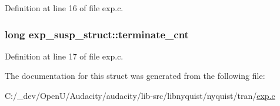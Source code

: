 Definition at line 16 of file exp.\+c.

\subsubsection[{\texorpdfstring{terminate\+\_\+cnt}{terminate_cnt}}]{\setlength{\rightskip}{0pt plus 5cm}long exp\+\_\+susp\+\_\+struct\+::terminate\+\_\+cnt}\hypertarget{structexp__susp__struct_a4b90b8b57e4d6f068b3003fd99fefc51}{}\label{structexp__susp__struct_a4b90b8b57e4d6f068b3003fd99fefc51}


Definition at line 17 of file exp.\+c.



The documentation for this struct was generated from the following file\+:\begin{DoxyCompactItemize}
\item 
C\+:/\+\_\+dev/\+Open\+U/\+Audacity/audacity/lib-\/src/libnyquist/nyquist/tran/\hyperlink{exp_8c}{exp.\+c}\end{DoxyCompactItemize}
